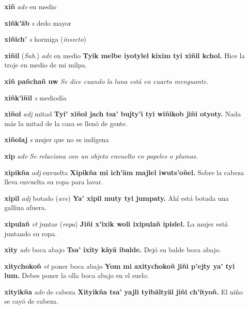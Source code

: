 \documentclass[10pt]{scrbook}
\newcommand{\entry}[1]{\textbf{#1}}
\newcommand{\nontranslationdef}[1]{\textit{#1}}
\newcommand{\partofspeech}[1]{\textit{#1}}
\newcommand{\spanishtranslation}[1]{#1}
\newcommand{\clarification}[1]{(\textit{#1})}
\newcommand{\cholexample}[1]{\textbf{#1}}
\newcommand{\exampletranslation}[1]{#1}
\newcommand{\relevantdialect}[1]{(\textit{#1})}
\begin{document}
\begin{multicols}{2}
\entry{xiñ}
\partofspeech{adv}
\spanishtranslation{en medio}

\entry{xiñk'äb}
\partofspeech{s}
\spanishtranslation{dedo mayor}

\entry{xiñich'}
\partofspeech{s}
\spanishtranslation{hormiga}
\clarification{insecto}

\entry{xiñil}
\relevantdialect{Sab.}
\partofspeech{adv}
\spanishtranslation{en medio}
\cholexample{Tyik melbe iyotylel kixim tyi xiñil kchol.}
\exampletranslation{Hice la troje en medio de mi milpa.}

\entry{xiñ pañchañ uw}
\nontranslationdef{Se dice cuando la luna está en cuarto menguante.}

\entry{xiñk'iñil}
\partofspeech{s}
\spanishtranslation{mediodía}

\entry{xiñol}
\partofspeech{adj}
\spanishtranslation{mitad}
\cholexample{Tyi' xiñol jach tsa' bujty'i tyi wiñikob jiñi otyoty.}
\exampletranslation{Nada más la mitad de la casa se llenó de gente.}

\entry{xiñolaj}
\partofspeech{s}
\spanishtranslation{mujer que no es indígena}

\entry{xip}
\partofspeech{adv}
\nontranslationdef{Se relaciona con un objeto envuelto en papeles o plumas.}

\entry{xipikña}
\partofspeech{adj}
\spanishtranslation{envuelta}
\cholexample{Xipikña mi ich'äm majlel iwuts'oñel.}
\exampletranslation{Sobre la cabeza lleva envuelta su ropa para lavar.}

\entry{xipil}
\partofspeech{adj}
\spanishtranslation{botado}
\clarification{ave}
\cholexample{Ya' xipil muty tyi jumpaty.}
\exampletranslation{Ahí está botada una gallina afuera.}

\entry{xipulañ}
\partofspeech{vt}
\spanishtranslation{juntar}
\clarification{ropa}
\cholexample{Jiñi x'ixik woli ixipulañ ipislel.}
\exampletranslation{La mujer está juntando su ropa.}

\entry{xity}
\partofspeech{adv}
\spanishtranslation{boca abajo}
\cholexample{Tsa' ixity käyä ibalde.}
\exampletranslation{Dejó su balde boca abajo.}

\entry{xitychokoñ}
\partofspeech{vt}
\spanishtranslation{poner boca abajo}
\cholexample{Yom mi axitychokoñ jiñi p'ejty ya' tyi lum.}
\exampletranslation{Debes poner la olla boca abajo en el suelo.}

\entry{xityikña}
\partofspeech{adv}
\spanishtranslation{de cabeza}
\cholexample{Xityikña tsa' yajli tyibältyäl jiñi ch'ityoñ.}
\exampletranslation{El niño se cayó de cabeza.}


\end{multicols}
\end{document}
